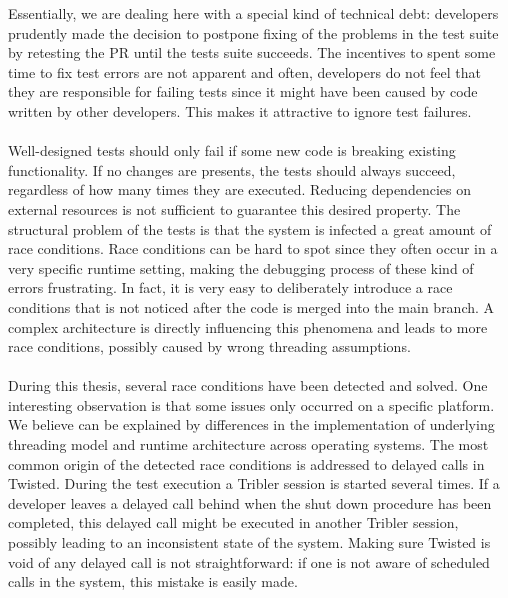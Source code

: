 \noindent Essentially, we are dealing here with a special kind of technical debt: developers prudently made the decision to postpone fixing of the problems in the test suite by retesting the PR until the tests suite succeeds. The incentives to spent some time to fix test errors are not apparent and often, developers do not feel that they are responsible for failing tests since it might have been caused by code written by other developers. This makes it attractive to ignore test failures.\\\\
Well-designed tests should only fail if some new code is breaking existing functionality. If no changes are presents, the tests should always succeed, regardless of how many times they are executed. Reducing dependencies on external resources is not sufficient to guarantee this desired property. The structural problem of the tests is that the system is infected a great amount of race conditions. Race conditions can be hard to spot since they often occur in a very specific runtime setting, making the debugging process of these kind of errors frustrating. In fact, it is very easy to deliberately introduce a race conditions that is not noticed after the code is merged into the main branch. A complex architecture is directly influencing this phenomena and leads to more race conditions, possibly caused by wrong threading assumptions.\\\\
During this thesis, several race conditions have been detected and solved. One interesting observation is that some issues only occurred on a specific platform. We believe can be explained by differences in the implementation of underlying threading model and runtime architecture across operating systems. The most common origin of the detected race conditions is addressed to delayed calls in Twisted. During the test execution a Tribler session is started several times. If a developer leaves a delayed call behind when the shut down procedure has been completed, this delayed call might be executed in another Tribler session, possibly leading to an inconsistent state of the system. Making sure Twisted is void of any delayed call is not straightforward: if one is not aware of scheduled calls in the system, this mistake is easily made.

